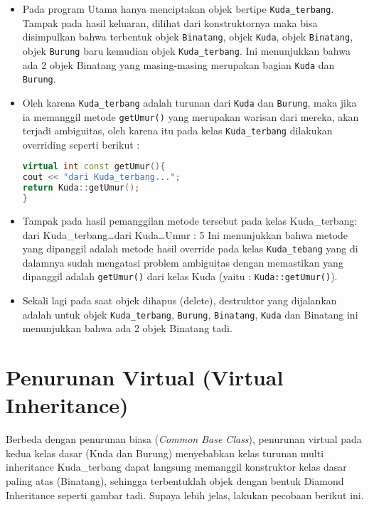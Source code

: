 \begin{itemize}
\item
  Pada program Utama hanya menciptakan objek bertipe
  \texttt{Kuda\_terbang}. Tampak pada hasil keluaran, dilihat dari
  konstruktornya maka bisa disimpulkan bahwa terbentuk objek
  \texttt{Binatang}, objek \texttt{Kuda}, objek \texttt{Binatang}, objek
  \texttt{Burung} baru kemudian objek \texttt{Kuda\_terbang}. Ini
  menunjukkan bahwa ada 2 objek Binatang yang masing-masing merupakan
  bagian \texttt{Kuda} dan \texttt{Burung}.
\item
  Oleh karena \texttt{Kuda\_terbang} adalah turunan dari \texttt{Kuda}
  dan \texttt{Burung}, maka jika ia memanggil metode \texttt{getUmur()}
  yang merupakan warisan dari mereka, akan terjadi ambiguitas, oleh
  karena itu pada kelas \texttt{Kuda\_terbang} dilakukan overriding
  seperti berikut :

\begin{lstlisting}[language=c++, numbers=none]
virtual int const getUmur(){
cout << "dari Kuda_terbang...";
return Kuda::getUmur();
}
\end{lstlisting}
\item
  Tampak pada hasil pemanggilan metode tersebut pada kelas
  Kuda\_terbang: dari Kuda\_terbang\ldots{}dari Kuda\ldots{}Umur : 5 Ini
  menunjukkan bahwa metode yang dipanggil adalah metode hasil override
  pada kelas \texttt{Kuda\_tebang} yang di dalamnya sudah mengatasi
  problem ambiguitas dengan memastikan yang dipanggil adalah
  \texttt{getUmur()} dari kelas Kuda (yaitu : \texttt{Kuda::getUmur()}).
\item
  Sekali lagi pada saat objek dihapus (delete), destruktor yang
  dijalankan adalah untuk objek \texttt{Kuda\_terbang}, \texttt{Burung},
  \texttt{Binatang}, \texttt{Kuda} dan Binatang ini menunjukkan bahwa
  ada 2 objek Binatang tadi.
\end{itemize}

\section{Penurunan Virtual (Virtual
Inheritance)}\label{penurunan-virtual-virtual-inheritance}

Berbeda dengan penurunan biasa (\emph{Common Base Class}), penurunan
virtual pada kedua kelas dasar (Kuda dan Burung) menyebabkan kelas
turunan multi inheritance Kuda\_terbang dapat langsung memanggil
konstruktor kelas dasar paling atas (Binatang), sehingga terbentuklah
objek dengan bentuk Diamond Inheritance seperti gambar tadi. Supaya
lebih jelas, lakukan pecobaan berikut ini.

